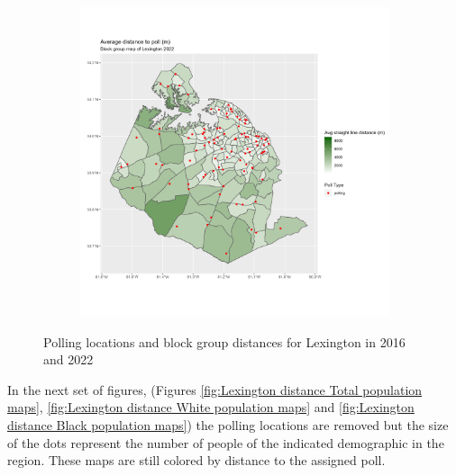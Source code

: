 \documentclass[11pt]{article}
\theoremstyle{remark}
\theoremstyle{definition}
\begin{document}
\begin{figure}
\begin{subfigure}{.5\textwidth}
		\includegraphics[width=\linewidth]{result_analysis/Lexington_SC_original_configs/distance_map_Lexington_config_original_2022_polls.png}
		\label{sfig:Lexington_2022_bg_dist}
	\end{subfigure}
	\caption{Polling locations and block group distances for Lexington in 2016 and 2022}
	\label{fig:Lexington distance maps}
\end{figure}

In the next set of figures, (Figures \ref{fig:Lexington distance Total population maps}, \ref{fig:Lexington distance White population maps} and \ref{fig:Lexington distance Black population maps}) the polling locations are removed but the size of the dots represent the number of people of the indicated demographic in the region. These maps are still colored by distance to the assigned poll.
\end{document}
